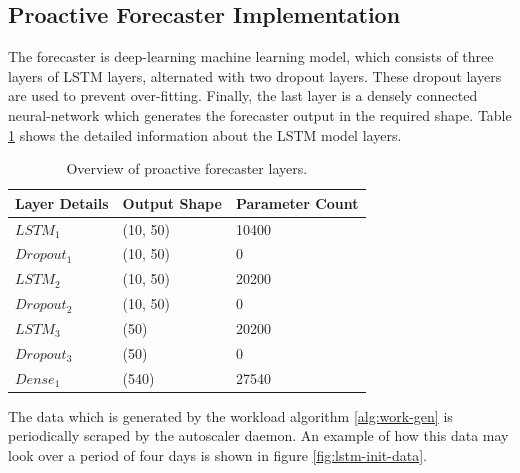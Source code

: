 \subsection{Proactive Forecaster Implementation}
\label{subsec:ch5-forecaster-implement}


The forecaster is deep-learning machine learning model, which consists of three layers of LSTM layers, alternated with two dropout layers. These dropout layers are used to prevent over-fitting. Finally, the last layer is a densely connected neural-network which generates the forecaster output in the required shape. Table \ref{tab:lstm-layers} shows the detailed information about the LSTM model layers.\par

\begin{table}
    \caption{Overview of proactive forecaster layers.}\label{tab:lstm-layers}
    \centering
    \begin{tabular}{|l|l|l|}
        \hline
        Layer Details & Output Shape & Parameter Count\\
        \hline
        $LSTM_{1}$ & (10, 50) & 10400\\
        $Dropout_{1}$ & (10, 50) & 0\\
        $LSTM_{2}$ & (10, 50) & 20200\\
        $Dropout_{2}$ & (10, 50) & 0\\
        $LSTM_{3}$ & (50) & 20200\\
        $Dropout_{3}$ & (50) & 0\\
        $Dense_{1}$ & (540) & 27540\\
        \hline
    \end{tabular}
\end{table}


The data which is generated by the workload algorithm \ref{alg:work-gen} is periodically scraped by the autoscaler daemon. An example of how this data may look over a period of four days is shown in figure \ref{fig:lstm-init-data}.

